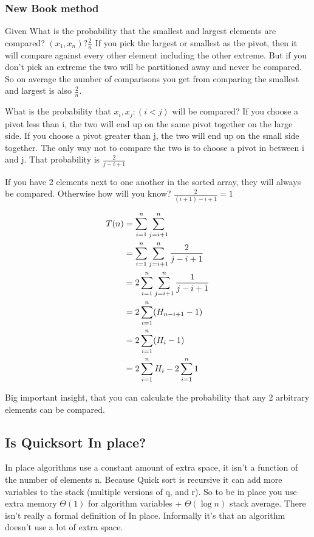 \documentclass[english, 10pt]{article}
\begin{document}
\subsubsection{New Book method}

Given What is the probability that the smallest and largest elements are
compared? $(x_1,x_n)? \frac{2}{n}$ If you pick the largest or smallest as the
pivot, then it will compare against every other element including the other
extreme. But if you don't pick an extreme the two will be partitioned away and
never be compared. So on average the number of comparisons you get from
comparing the smallest and largest is also $\frac{2}{n}$.

What is the probability that $x_i, x_j : (i<j) $ will be compared? If you
choose a pivot less than i, the two will end up on the same pivot together on
the large side. If you choose a pivot greater than j, the two will end up on
the small side together. The only way not to compare the two is to choose a
pivot in between i and j. That probability is $\frac{2}{j-i+1}$

If you have 2 elements next to one another in the sorted array, they will
always be compared. Otherwise how will you know? $\frac{2}{(i+1)-i+1} = 1$




\begin{align*}
    T(n) &= \s{i=1}{n}\s{j=i+1}{n} \\ %
    &=\s{i=1}{n}\s{j=i+1}{n} \frac{2}{j-i+1} \\
    &=2 \s{i=1}{n} \s{j=i+1}{n} \frac{1}{j-i+1}\\
    &=2 \s{i=1}{n} (H_{n-i+1} -1) \\
    &=2 \s{i=1}{n} (H_{i} -1) \\
    &= 2\s{i=1}{n} H_i - 2\s{i=1}{n} 1 \\
\end{align*}

Big important insight, that you can calculate the probability that any 2  arbitrary elements can be compared.

\subsection{Is Quicksort In place?}

In place algorithms use a constant amount of extra space, it isn't a function
of the number of elements n.  Because Quick sort is recursive it can add more
variables to the stack (multiple versions of q, and r).  So to be in place you
use extra memory $\Theta(1)$ for algorithm variables + $\Theta(\log n)$ stack
average.  There isn't really a formal definition of In place.  Informally it's
that an algorithm doesn't use a lot of extra space.
\end{document}
